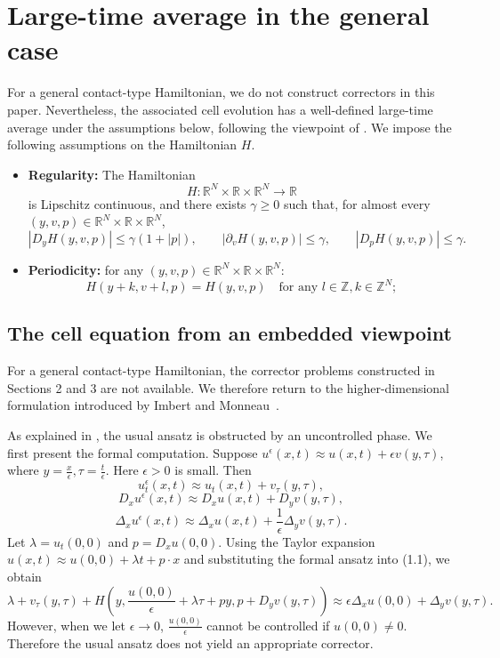 \documentclass[preprint]{elsarticle}
\numberwithin{equation}{section}
\begin{document}
\section{Large-time average in the general case}

For a general contact-type Hamiltonian, we do not construct correctors in this paper. Nevertheless, the associated cell evolution has a well-defined large-time average under the assumptions below, following the viewpoint of \cite{imbert2008homogenization}.
We impose the following assumptions on the Hamiltonian $H$.

\begin{itemize}
 \item[(H1).] \textbf{Regularity:} The Hamiltonian
\[
H:\mathbb R^N\times\mathbb R\times\mathbb R^N\to\mathbb R
\]
is Lipschitz continuous, and there exists $\gamma\geq0$ such that, for almost every $(y,v,p)\in\mathbb R^N\times\mathbb R\times\mathbb R^N$,
\[
|D_yH(y,v,p)|\leq\gamma(1+|p|),\qquad
|\partial_vH(y,v,p)|\leq\gamma,\qquad
|D_pH(y,v,p)|\leq\gamma.
\]

 \item[(H2).] \textbf{Periodicity:} for any $(y,v, p) \in \mathbb{R}^N \times \mathbb{R} \times \mathbb{R}^N$:
 \[
 H(y+k,v+l, p) = H(y,v, p) \quad \text{for any } l \in \mathbb{Z}, k \in \mathbb{Z}^N;
 \]
\end{itemize}
\subsection{The cell equation from an embedded viewpoint}
For a general contact-type Hamiltonian, the corrector problems constructed in Sections 2 and 3 are not available. We therefore return to the higher-dimensional formulation introduced by Imbert and Monneau~\cite{imbert2008homogenization}.

As explained in \cite{imbert2008homogenization}, the usual ansatz is obstructed by an uncontrolled phase. We first present the formal computation. Suppose $u^\epsilon(x,t) \approx u(x,t) + \epsilon v(y, \tau)$, where $y = \frac{x}{\epsilon}, \tau = \frac{t}{\epsilon}$. Here $\epsilon > 0$ is small. Then
\[
u^\epsilon_t(x,t) \approx u_t(x,t) + v_\tau(y,\tau),
\]
\[
D_x u^\epsilon(x,t) \approx D_x u(x,t) + D_y v(y,\tau),
\]
\[
\Delta_x u^\epsilon(x,t) \approx \Delta_x u(x,t) + \frac{1}{\epsilon}\Delta_y v(y,\tau).
\]
Let $\lambda = u_t(0,0)$ and $p = D_x u(0,0)$. Using the Taylor expansion $u(x,t) \approx u(0,0)+\lambda t+p\cdot x$ and substituting the formal ansatz into (1.1), we obtain
\[
\lambda + v_\tau(y,\tau) + H\left(y, \frac{u(0,0)}{\epsilon} + \lambda \tau + py, p + D_y v(y,\tau)\right) \approx \epsilon \Delta_x u(0,0) + \Delta_y v(y,\tau).
\]
However, when we let $\epsilon \rightarrow 0$, $\frac{u(0,0)}{\epsilon}$ cannot be controlled if $u(0,0) \neq 0$. Therefore the usual ansatz does not yield an appropriate corrector.
\end{document}
